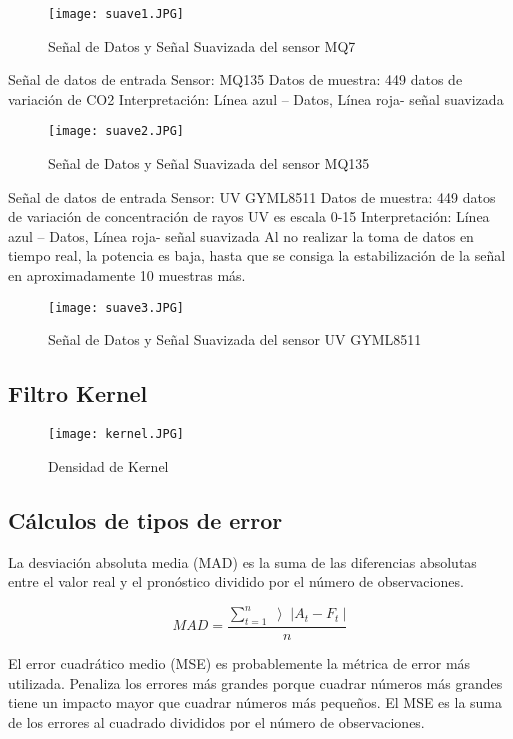 \documentclass[10pt,a4paper]{article}
\begin{document}
\begin{figure}[H]
\centering
\texttt{[image: suave1.JPG]}
 \caption{Señal de Datos y Señal Suavizada del sensor MQ7} 
\end{figure} 


Señal de datos de entrada 
Sensor: MQ135   Datos de muestra: 449 datos de variación de CO2
Interpretación:  Línea azul – Datos, Línea roja- señal suavizada 

\begin{figure}[H]
\centering
\texttt{[image: suave2.JPG]}
 \caption{Señal de Datos y Señal Suavizada del sensor MQ135} 
\end{figure} 

Señal de datos de entrada 
Sensor:  UV GYML8511 		
Datos de muestra:  449 datos de variación de concentración de rayos UV es escala 0-15
Interpretación: Línea azul – Datos, Línea roja- señal suavizada 
Al no realizar la toma de datos en tiempo real, la potencia es baja, hasta que se consiga la estabilización de la señal en aproximadamente 10 muestras más. 

\begin{figure}[H]
\centering
\texttt{[image: suave3.JPG]}
 \caption{Señal de Datos y Señal Suavizada del sensor UV GYML8511} 
\end{figure} 

\subsection{Filtro Kernel}


\begin{figure}[H]
\centering
\texttt{[image: kernel.JPG]}
 \caption{Densidad de Kernel} 
\end{figure} 

\subsection{Cálculos de tipos de error }
La desviación absoluta media (MAD) es la suma de las diferencias absolutas entre el valor real y el pronóstico dividido por el número de observaciones.

\begin{equation}
MAD= \frac{\sum_{t=1}^{n}\left >|A_{t}-F_{t}\ \right |}{n}
\end{equation}

El error cuadrático medio (MSE) es probablemente la métrica de error más utilizada. Penaliza los errores más grandes porque cuadrar números más grandes tiene un impacto mayor que cuadrar números más pequeños. El MSE es la suma de los errores al cuadrado divididos por el número de observaciones.
\end{document}
